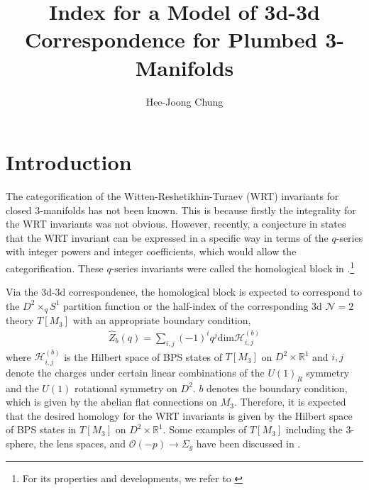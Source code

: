 \documentclass[11pt,hyper,a4paper]{article}
\title{Index for a Model of 3d-3d Correspondence for Plumbed 3-Manifolds}
\author{Hee-Joong Chung}
\affiliation{Yau Mathematical Sciences Center, Tsinghua University, Beijing 100084, China}
\begin{document}
\maketitle
















\section{Introduction}

The categorification of the Witten-Reshetikhin-Turaev (WRT) invariants for closed 3-manifolds has not been known.
This is because firstly the integrality for the WRT invariants was not obvious.
However, recently, a conjecture in \cite{Gukov-Putrov-Vafa,Gukov-Pei-Putrov-Vafa} states that the WRT invariant can be expressed in a specific way in terms of the $q$-series with integer powers and integer coefficients, which would allow the categorification.
These $q$-series invariants were called the homological block in \cite{Gukov-Putrov-Vafa,Gukov-Pei-Putrov-Vafa}.\footnote{For its properties and developments, we refer to \cite{Gukov-Marino-Putrov, Cheng-Chun-Ferrari-Gukov-Harrison, Chung-Seifert, Kucharski:2019fgh, Chung-rationalk, Park:2019xey, Chun-Gukov-Park-Sopenko}}


Via the 3d-3d correspondence, the homological block is expected to correspond to the $D^2 \times_q S^1$ partition function or the half-index of the corresponding 3d $\mathcal{N}=2$ theory $T[M_3]$ with an appropriate boundary condition, 
\begin{align}
\widehat{Z}_b(q) = \sum_{i,j} (-1)^i q^j \text{dim} \mathcal{H}^{(b)}_{i,j}
\end{align}
where $\mathcal{H}^{(b)}_{i,j}$ is the Hilbert space of BPS states of $T[M_3]$ on $D^2 \times \mathbb{R}^1$ and $i, j$ denote the charges under certain linear combinations of the $U(1)_R$ symmetry and the $U(1)$ rotational symmetry on $D^2$.
$b$ denotes the boundary condition, which is given by the abelian flat connections on $M_3$.
Therefore, it is expected that the desired homology for the WRT invariants is given by the Hilbert space of BPS states in $T[M_3]$ on $D^2 \times \mathbb{R}^1$.
Some examples of $T[M_3]$ including the 3-sphere, the lens spaces, and $\mathcal{O}(-p)\rightarrow \Sigma_g$ have been discussed in \cite{Gukov-Pei-Putrov-Vafa}.	\\
\end{document}
